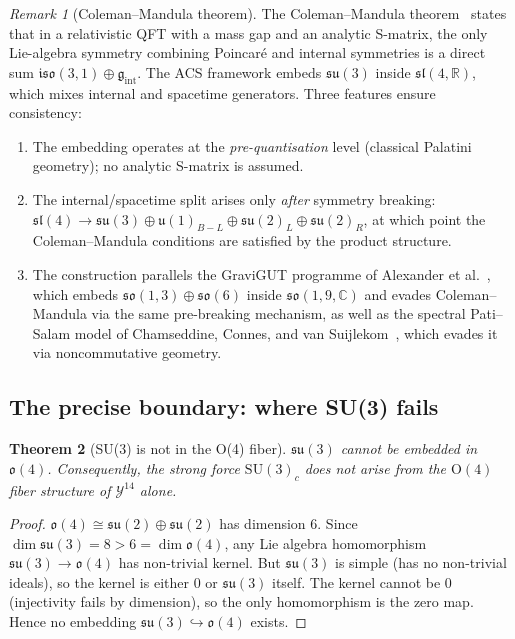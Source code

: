 \documentclass[11pt,a4paper]{article}
\theoremstyle{plain}
\newtheorem{theorem}{Theorem}[section]
\theoremstyle{definition}
\theoremstyle{remark}
\newtheorem{remark}[theorem]{Remark}
\begin{document}
\begin{remark}[Coleman--Mandula theorem]\label{rem:coleman-mandula}
The Coleman--Mandula theorem~\cite{ColemanMandula1967} states that
in a relativistic QFT with a mass gap and an analytic S-matrix,
the only Lie-algebra symmetry combining Poincar\'{e} and internal
symmetries is a direct sum $\mathfrak{iso}(3,1) \oplus \mathfrak{g}_{\mathrm{int}}$.
The ACS framework embeds $\mathfrak{su}(3)$ inside
$\mathfrak{sl}(4,\mathbb{R})$, which mixes internal and spacetime
generators.  Three features ensure consistency:
\begin{enumerate}[label=(\roman*),noitemsep]
  \item The embedding operates at the \emph{pre-quantisation} level
    (classical Palatini geometry); no analytic S-matrix is assumed.
  \item The internal/spacetime split arises only \emph{after}
    symmetry breaking: $\mathfrak{sl}(4) \to \mathfrak{su}(3) \oplus
    \mathfrak{u}(1)_{B{-}L} \oplus \mathfrak{su}(2)_L \oplus
    \mathfrak{su}(2)_R$, at which point the Coleman--Mandula
    conditions are satisfied by the product structure.
  \item The construction parallels the GraviGUT programme of
    Alexander et al.~\cite{Alexander2025}, which embeds
    $\mathfrak{so}(1,3) \oplus \mathfrak{so}(6)$ inside
    $\mathfrak{so}(1,9,\mathbb{C})$ and evades Coleman--Mandula
    via the same pre-breaking mechanism, as well as the spectral
    Pati--Salam model of Chamseddine, Connes, and van
    Suijlekom~\cite{ChamseddineConnes2015}, which evades it via
    noncommutative geometry.
\end{enumerate}
\end{remark}

\subsection{The precise boundary: where SU(3) fails}

\begin{theorem}[SU(3) is not in the O(4) fiber]\label{thm:no-su3}\label{thm:su3-gap}
$\mathfrak{su}(3)$ cannot be embedded in $\mathfrak{o}(4)$.  
Consequently, the strong force $\mathrm{SU}(3)_c$ does not arise from 
the $\mathrm{O}(4)$ fiber structure of $\mathcal{Y}^{14}$ alone.
\end{theorem}

\begin{proof}
$\mathfrak{o}(4) \cong \mathfrak{su}(2) \oplus \mathfrak{su}(2)$ has dimension 6.
Since $\dim\mathfrak{su}(3) = 8 > 6 = \dim\mathfrak{o}(4)$, any Lie algebra 
homomorphism $\mathfrak{su}(3) \to \mathfrak{o}(4)$ has non-trivial kernel.
But $\mathfrak{su}(3)$ is simple (has no non-trivial ideals), so the kernel 
is either $0$ or $\mathfrak{su}(3)$ itself.  The kernel cannot be $0$ 
(injectivity fails by dimension), so the only homomorphism is the zero map.
Hence no embedding $\mathfrak{su}(3) \hookrightarrow \mathfrak{o}(4)$ exists.
\end{proof}
\end{document}

